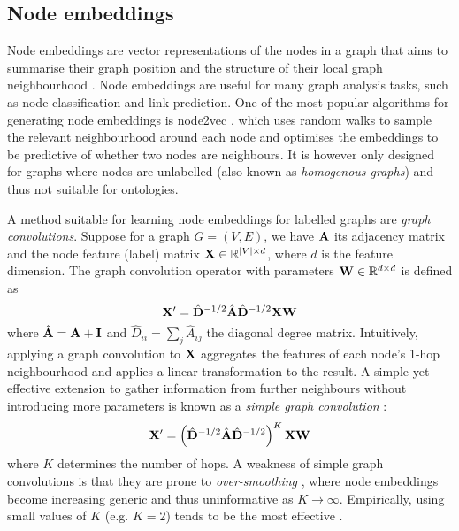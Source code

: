 \subsection{Node embeddings}

Node embeddings are vector representations of the nodes in a graph that aims to summarise their graph position and the structure of their local graph neighbourhood \cite{hamilton2020graph}. Node embeddings are useful for many graph analysis tasks, such as node classification and link prediction. One of the most popular algorithms for generating node embeddings is node2vec \cite{grover2016node2vec}, which uses random walks to sample the relevant neighbourhood around each node and optimises the embeddings to be predictive of whether two nodes are neighbours. It is however only designed for graphs where nodes are unlabelled (also known as \emph{homogenous graphs}) and thus not suitable for ontologies.

A method suitable for learning node embeddings for labelled graphs are \emph{graph convolutions}. Suppose for a graph $G = (V, E)$, we have $\mathbf{A}$ its adjacency matrix and the node feature (label) matrix $\mathbf{X} \in \mathbb{R}^{|V| \times d}$, where $d$ is the feature dimension. The graph convolution operator with parameters $\mathbf{W} \in \mathbb{R}^{d \times d}$ is defined as
\[
    \mathbf{X}' = \hat{\mathbf{D}}^{-1/2} \hat{\mathbf{A}} \hat{\mathbf{D}}^{-1/2} \mathbf{X} \mathbf{W}
\]
where $\hat{\mathbf{A}} = \mathbf{A} + \mathbf{I}$ and $\hat{D}_{ii} = \sum_j \hat{A}_{ij}$ the diagonal degree matrix. Intuitively, applying a graph convolution to $\mathbf{X}$ aggregates the features of each node's 1-hop neighbourhood and applies a linear transformation to the result. A simple yet effective extension to gather information from further neighbours without introducing more parameters is known as a \emph{simple graph convolution} \cite{wu2019simplifying}:
\begin{equation}  \label{eq:simple-graph-conv}
    \mathbf{X}' = \left(\hat{\mathbf{D}}^{-1/2} \hat{\mathbf{A}} \hat{\mathbf{D}}^{-1/2}\right)^K \mathbf{X} \mathbf{W}
\end{equation}
where $K$ determines the number of hops. A weakness of simple graph convolutions is that they are prone to \emph{over-smoothing} \cite{zhu2020simple}, where node embeddings become increasing generic and thus uninformative as $K \to \infty$. Empirically, using small values of $K$ (e.g. $K = 2$) tends to be the most effective \cite{wu2019simplifying}.